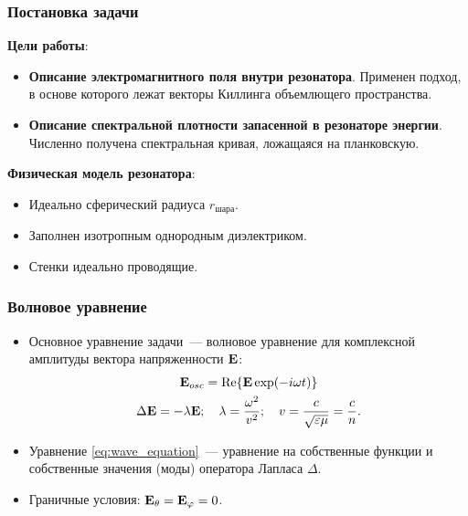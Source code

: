 \documentclass[compress]{beamer}
\begin{document}
    \begin{frame}\frametitle{Постановка задачи}

        \textbf{Цели работы}:
        \begin{itemize}
            \item \textbf{Описание электромагнитного поля внутри резонатора}.
                Применен подход, в основе которого лежат векторы Киллинга объемлющего пространства.
            \item \textbf{Описание спектральной плотности запасенной в резонаторе энергии}.
                Численно получена спектральная кривая, ложащаяся на планковскую.
        \end{itemize}

        \textbf{Физическая модель резонатора}:
        \begin{itemize}
            \item Идеально сферический радиуса $r_\text{шара}$.
            \item Заполнен изотропным однородным диэлектриком.
            \item Стенки идеально проводящие.
        \end{itemize}

    \end{frame}


    \begin{frame}\frametitle{Волновое уравнение}

        \begin{itemize}

            \item Основное уравнение задачи~--- волновое уравнение для комплексной амплитуды вектора напряженности $\mathbf{E}$:
            \begin{gather}
                \vb{E}_{osc} = \Re{\vb{E} \exp(-i \omega t)} \nonumber \\
                \Delta \mathbf{E} = - \lambda \mathbf{E} ; \quad
                    \lambda = \frac{\omega^2}{v^2} ; \quad
                    v = \frac{c}{\sqrt{\varepsilon\mu}} = \frac{c}{n} \label{eq:wave_equation}.
            \end{gather}

            \item Уравнение \autoref{eq:wave_equation}~--- уравнение на собственные функции и собственные значения (моды) оператора Лапласа $\Delta$.

            \item Граничные условия: $\vb{E}_\theta = \vb{E}_\varphi = 0$.

        \end{itemize}

    \end{frame}
\end{document}
